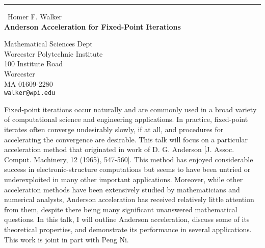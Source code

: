\documentclass{report}
\begin{document}
\begin{center}
\rule{6in}{1pt} \
{\large Homer F. Walker \\
{\bf Anderson Acceleration for Fixed-Point Iterations}}

Mathematical Sciences Dept \\ Worcester Polytechnic Institute \\ 100 Institute Road \\ Worcester \\ MA 01609-2280
\\
{\tt walker@wpi.edu}\end{center}

Fixed-point iterations occur naturally and are commonly used in a broad
variety of computational science and engineering applications. In
practice, fixed-point iterates often converge undesirably slowly, if at
all, and procedures for accelerating the convergence are desirable. This
talk will focus on a particular acceleration method that originated in
work of D. G. Anderson [J. Assoc. Comput. Machinery, 12 (1965), 547-560].
This method has enjoyed considerable success in electronic-structure
computations but seems to have been untried or underexploited in many
other important applications. Moreover, while other acceleration methods
have been extensively studied by mathematicians and numerical analysts,
Anderson acceleration has received relatively little attention from them,
despite there being many significant unanswered mathematical questions.
In this talk, I will outline Anderson acceleration, discuss some of its
theoretical properties, and demonstrate its performance in several
applications. This work is joint in part with Peng Ni.
\end{document}
